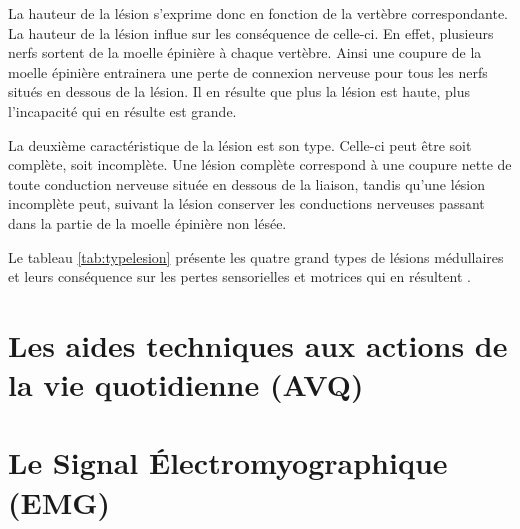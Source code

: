 \documentclass[letterpaper, twoside, 12pt, memoire, creativecommons, hyperref]{thETS}
\begin{document}
La hauteur de la lésion s'exprime donc en fonction de la vertèbre correspondante. La hauteur de la lésion influe sur les conséquence de celle-ci. En effet, plusieurs nerfs sortent de la moelle épinière à chaque vertèbre. Ainsi une coupure de la moelle épinière entrainera une perte de connexion nerveuse pour tous les nerfs situés en dessous de la lésion. Il en résulte que plus la lésion est haute, plus l'incapacité qui en résulte est grande. 

La deuxième caractéristique de la lésion est son type. Celle-ci peut être soit complète, soit incomplète. Une lésion complète correspond à une coupure nette de toute conduction nerveuse située en dessous de la liaison, tandis qu'une lésion incomplète peut, suivant la lésion conserver les conductions nerveuses passant dans la partie de la moelle épinière non lésée.

Le tableau \ref{tab:typelesion} présente les quatre grand types de lésions médullaires et leurs conséquence sur les pertes sensorielles et motrices qui en résultent \citep{apparelyzed2008}.

\section{Les aides techniques aux actions de la vie quotidienne (AVQ)}

\section{Le Signal Électromyographique (EMG)}
\end{document}
